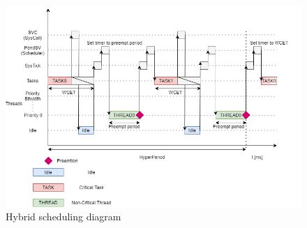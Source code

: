 \begin{figure}[H]
\begin{center}
\includegraphics[width=1\textwidth]{images/hybrid_scheduling.png}
\caption{Hybrid scheduling diagram}
\label{fig:HybridScheduling}
\end{center}
\end{figure}

